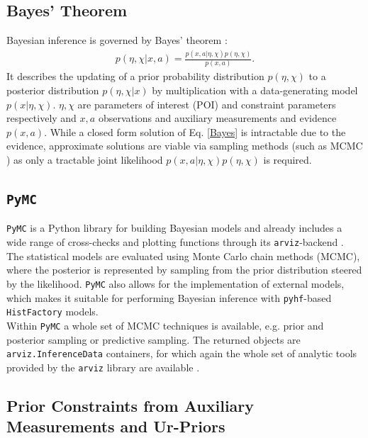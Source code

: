 \subsection{Bayes' Theorem}
Bayesian inference is governed by Bayes' theorem \cite{ConjPriorsBerkeley}:
    \begin{align} \label{Bayes}
        p(\eta, \chi \vert x, a) = \frac{p(x, a\vert \eta, \chi) p(\eta, \chi)}{p(x, a)}.
    \end{align}
 \noindent It describes the updating of a prior probability distribution $p(\eta, \chi)$ to a posterior distribution $p(\eta, \chi \vert x)$ by multiplication with a data-generating model $p(x \vert \eta, \chi)$. $\eta, \chi$ are parameters of interest (POI) and constraint parameters respectively and $x, a$ observations and auxiliary measurements and evidence $p(x, a)$. While a closed form solution of Eq. \eqref{Bayes} is intractable due to the evidence, approximate solutions are viable via sampling methods (such as MCMC \cite{PyMC}) as only a tractable joint likelihood $p(x, a \vert \eta, \chi)p(\eta, \chi)$ is required.

\subsection{\texttt{PyMC}} 
\texttt{PyMC} is a Python library for building Bayesian models and already includes a wide range of cross-checks and plotting functions through its \texttt{arviz}-backend \cite{PyMC, arviz}. \\ 
\noindent The statistical models are evaluated using Monte Carlo chain methods (MCMC), where the posterior is represented by sampling from the prior distribution steered by the likelihood. 
\noindent \texttt{PyMC} also allows for the implementation of external models, which makes it suitable for performing Bayesian inference with \texttt{pyhf}-based \texttt{HistFactory} models. \\
Within \texttt{PyMC} a whole set of MCMC techniques is available, e.g. prior and posterior sampling or predictive sampling. The returned objects are \texttt{arviz.InferenceData} containers, for which again the whole set of analytic tools provided by the \texttt{arviz} library are available \cite{arviz}. 


\subsection{Prior Constraints from Auxiliary Measurements and Ur-Priors}

